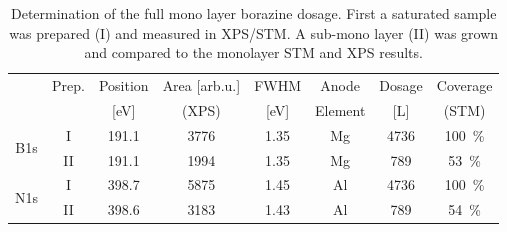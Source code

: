 \begin{table}[h!]
	\centering
	\caption{Determination of the full mono layer borazine dosage. First a saturated sample was prepared (I) and measured in XPS/STM. A sub-mono layer (II) was grown and compared to the monolayer STM and XPS results.}
	\begin{tabular}{cccccccc}
		& Prep. & Position    & Area [arb.u.] & FWHM  & Anode & Dosage  & Coverage\\ 
		&	  &	[eV]	& (XPS)		&[eV]	&Element&[L]	  & (STM) \\ \hline \hline
		\multirow{2}{*}{B1s} 	&I& 191.1 & 3776 & 1.35 & Mg & 4736 & \SI{100}{\percent}\\
		&II& 191.1 & 1994 & 1.35 & Mg & 789 &\SI{53}{\percent}\\ \hline
		\multirow{2}{*}{N1s} 	&I& 398.7 & 5875 & 1.45 & Al  & 4736 & \SI{100}{\percent}\\
		&II& 398.6 & 3183 & 1.43 & Al & 789 &\SI{54}{\percent}\\
	\end{tabular}
\end{table}


